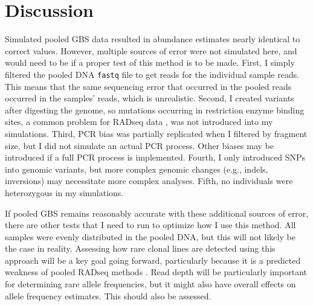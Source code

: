 
\section{Discussion}

Simulated pooled GBS data resulted in abundance estimates nearly identical to correct
values.
However, multiple sources of error were not simulated here, and would need to be if
a proper test of this method is to be made.
First, I simply filtered the pooled DNA \texttt{fastq} file to get reads for the 
individual sample reads. This means that the same sequencing error that occurred in 
the pooled reads occurred in the samples' reads, which is unrealistic.
Second, I created variants after digesting the genome, so mutations occurring in 
restriction enzyme binding sites, a common problem for RADseq data \citep{Andrews:2016bc},
was not introduced into my simulations.
Third, PCR bias was partially replicated when I filtered by fragment size, but
I did not simulate an actual PCR process. Other biases may be introduced if a full PCR
process is implemented.
Fourth, I only introduced SNPs into genomic variants, but more complex genomic 
changes (e.g., indels, inversions) may necessitate more complex analyses.
Fifth, no individuals were heterozygous in my simulations.

If pooled GBS remains reasonably accurate with these additional sources of error, there
are other tests that I need to run to optimize how I use this method.
All samples were evenly distributed in the pooled DNA, but this will not likely be
the case in reality. 
Assessing how rare clonal lines are detected using this approach will be a key goal 
going forward, particularly because it is a predicted weakness of pooled RADseq methods
\citep{Schlotterer:2014dk}.
Read depth will be particularly important for determining rare allele frequencies, but
it might also have overall effects on allele frequency estimates.
This should also be assessed.
